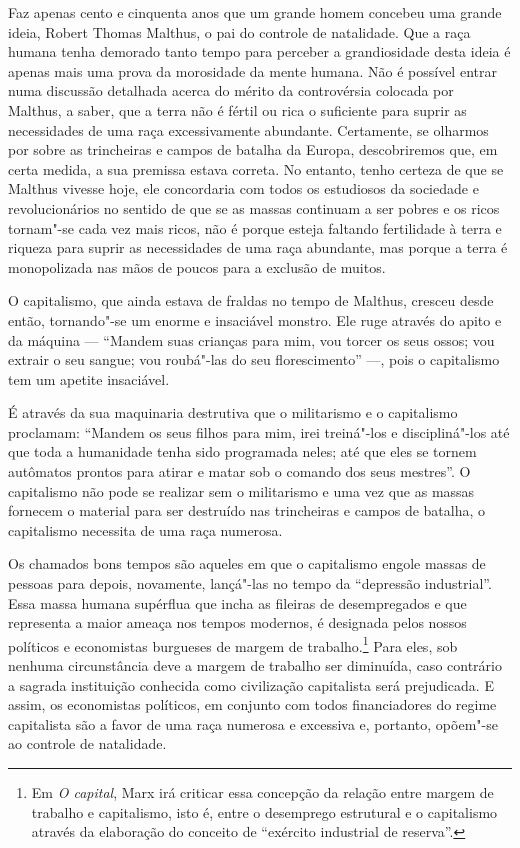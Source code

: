 Faz apenas cento e cinquenta anos que um grande homem concebeu uma
grande ideia, Robert Thomas Malthus, o pai do controle de natalidade.
Que a raça humana tenha demorado tanto tempo para perceber a
grandiosidade desta ideia é apenas mais uma prova da morosidade da mente
humana. Não é possível entrar numa discussão detalhada acerca do mérito
da controvérsia colocada por Malthus, a saber, que a terra não é fértil
ou rica o suficiente para suprir as necessidades de uma raça
excessivamente abundante. Certamente, se olharmos por sobre as
trincheiras e campos de batalha da Europa, descobriremos que, em
certa medida, a sua premissa estava correta. No entanto, tenho certeza
de que se Malthus vivesse hoje, ele concordaria com todos os estudiosos
da sociedade e revolucionários no sentido de que se as massas continuam
a ser pobres e os ricos tornam"-se cada vez mais ricos, não é porque
esteja faltando fertilidade à terra e riqueza para suprir as
necessidades de uma raça abundante, mas porque a terra é monopolizada
nas mãos de poucos para a exclusão de muitos.

O capitalismo, que ainda estava de fraldas no tempo de Malthus, cresceu
desde então, tornando"-se um enorme e insaciável monstro. Ele ruge
através do apito e da máquina --- ``Mandem suas crianças para mim, vou
torcer os seus ossos; vou extrair o seu sangue; vou roubá"-las do seu
florescimento'' ---, pois o capitalismo tem um apetite insaciável.

É através da sua maquinaria destrutiva que o militarismo e o capitalismo
proclamam: ``Mandem os seus filhos para mim, irei treiná"-los e
discipliná"-los até que toda a humanidade tenha sido programada neles;
até que eles se tornem autômatos prontos para atirar e matar sob o
comando dos seus mestres''. O capitalismo não pode se realizar sem o
militarismo e uma vez que as massas fornecem o material para ser destruído
nas trincheiras e campos de batalha, o capitalismo necessita de uma raça
numerosa.

Os chamados bons tempos são aqueles em que o capitalismo engole massas
de pessoas para depois, novamente, lançá"-las no tempo da ``depressão
industrial''. Essa massa humana supérflua que incha as fileiras de
desempregados e que representa a maior ameaça nos tempos modernos, é
designada pelos nossos políticos e economistas burgueses de margem de
trabalho.\footnote{Em \textit{O capital}, Marx irá criticar essa concepção da relação entre margem de trabalho e capitalismo, isto é, entre o desemprego estrutural e o capitalismo através da elaboração do conceito de ``exército industrial de reserva''.} Para eles, sob nenhuma circunstância deve a margem de trabalho
ser diminuída, caso contrário a sagrada instituição conhecida como
civilização capitalista será prejudicada. E assim, os economistas\label{margem}
políticos, em conjunto com todos financiadores do regime capitalista são
a favor de uma raça numerosa e excessiva e, portanto, opõem"-se ao
controle de natalidade.

